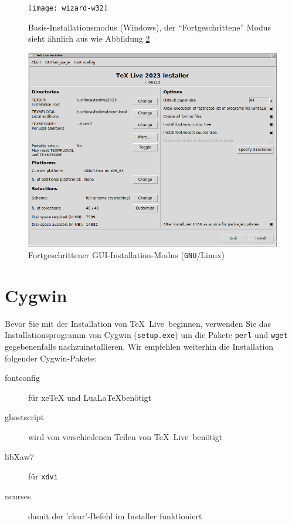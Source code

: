 \documentclass[12pt,ngerman,a4paper,fullparskip]{scrreprt}
\newcommand{\TL}{\TeX\ Live\xspace}
\newcommand{\acro}[1]{\texttt{#1}}
\newcommand{\code}[1]{\texttt{#1}}
\newcommand{\filename}[1]{\texttt{#1}}
\providecommand*{\GNU}{\acro{GNU}\xspace}
\providecommand*{\XeTeX}{xe\TeX\xspace}
\begin{document}
\begin{figure}[tb]
\texttt{[image: wizard-w32]}
\caption{Basis-Installationsmodus (Windows), der \enquote{Fortgeschrittene} Modus sieht ähnlich aus wie Abbildung
\ref{fig:advanced-lnx}}\label{fig:wizard-w32}
\end{figure}


\begin{figure}[tb]
\includegraphics[width={\linewidth}]{advanced-lnx}
\caption{Fortgeschrittener GUI-Installation-Modus (\GNU/Linux)}\label{fig:advanced-lnx}
\end{figure}

\section{Cygwin}\label{sec:cygwin}

Bevor Sie mit der Installation von \TL\ beginnen, verwenden Sie das
Installationsprogramm von Cygwin (\filename{setup.exe}) um die Pakete
\filename{perl} und \filename{wget} gegebenenfalls nachzuinstallieren.
Wir empfehlen weiterhin die Installation folgender Cygwin-Pakete:

\begin{description}
\item[fontconfig] für \XeTeX und Lua\LaTeX benötigt
\item[ghostscript] wird von verschiedenen Teilen von \TL\ benötigt
\item[libXaw7] für \code{xdvi}
\item[ncurses] damit der 'clear'-Befehl im Installer funktioniert
\end{description}
\end{document}
